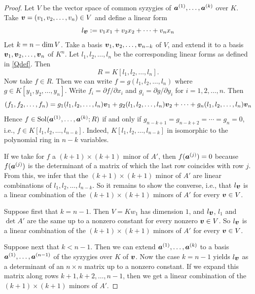 \documentclass[12pt]{article}
\theoremstyle{definition}
\theoremstyle{remark}
\def\dim{{\rm dim}}
\def\sol{{\rm Sol}}
\def\bolda{\mbox{\boldmath $a$}}
\def\boldv{\mbox{\boldmath $v$}}
\def\pa{\partial}
\begin{document}
\begin{proof}
Let $V$ be the vector space of common syzygies of $\bolda^{(1)}, \ldots, \bolda^{(k)}$
over $K$. Take $\boldv = (v_1,v_2,\ldots,v_n) \in V$ and define a linear form
\begin{equation} \label{Qdef}
l_{\boldv} := v_1 x_1 + v_2 x_2 + \cdots + v_n x_n
\end{equation}
Let $k = n - \dim \, V$. Take a basis 
$\boldv_1, \boldv_2, \allowbreak \ldots, \boldv_{n-k}$ of $V$, 
and extend it to a basis $\boldv_1, \boldv_2, \ldots, \boldv_n$ of $K^n$. 
Let $l_1, l_2, \ldots, \allowbreak l_n$ be the corresponding linear forms as 
defined in \eqref{Qdef}. Then 
$$
R = K[l_1,l_2,\ldots,l_n].
$$
Now take $f \in R$. Then we can write
$f = g(l_1,l_2,\ldots,l_n)$ where $g \in K[y_1,y_2,\ldots,y_n]$.
Write $f_i = \pa f / \pa x_i$ and $g_i = \pa g / \pa y_i$ for $i = 1,2,\ldots,n$. 
Then
$$
(f_1,f_2,\ldots,f_n) = g_1(l_1,l_2,\ldots,l_n) \boldv_1 + g_2(l_1,l_2,\ldots,l_n) \boldv_2 + 
\cdots + g_n(l_1,l_2,\ldots,l_n) \boldv_n
$$
Hence $f \in \sol(\bolda^{(1)}, \ldots, \bolda^{(k)}; R)$
if and only if $g_{n-k+1} = g_{n-k+2} = \cdots = g_n = 0$, i.e., 
$f \in K[l_1,l_2,\ldots,l_{n-k}]$. Indeed, $K[l_1,l_2,\ldots,l_{n-k}]$
in isomorphic to the polynomial ring in $n - k$ variables.

If we take for $f$ a $(k+1) \times (k+1)$ minor of $A'$, then 
$f(\bolda^{(j)}) = 0$ because $f(\bolda^{(j)})$ is the determinant of a matrix 
of which the last row coincides with row $j$. From this, we infer that
the $(k+1) \times (k+1)$ minor of $A'$ are linear combinations
of $l_1,l_2,\ldots,l_{n-k}$. So it remains to show the converse, i.e.,
that $l_{\boldv}$ is a linear combination of the $(k+1) \times (k+1)$ minors of 
$A'$ for every $\boldv \in V$.

Suppose first that $k = n - 1$. Then $V = K w_1$ has dimension $1$, and
$l_{\boldv}$, $l_1$ and $\det A'$ are the same up to a nonzero constant
for every nonzero $\boldv \in V$. So $l_{\boldv}$ is a linear combination 
of the $(k+1) \times (k+1)$ minors of $A'$ for every $\boldv \in V$.

Suppose next that $k < n - 1$. Then we can extend 
$\bolda^{(1)}, \ldots, \bolda^{(k)}$ to a basis $\bolda^{(1)}, \ldots, \bolda^{(n-1)}$
of the syzygies over $K$ of $\boldv$. Now the case $k = n - 1$ yields 
$l_{\boldv}$ as a determinant of an $n \times n$ matrix up to a nonzero 
constant. If we expand this matrix along rows $k+1, k+2, \ldots,n-1$, 
then we get a linear combination of the $(k+1) \times (k+1)$ minors of $A'$. 
\end{proof}
\end{document}

